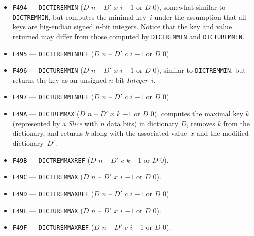\documentclass[12pt,oneside]{article}
\begin{document}
\begin{itemize}
\item {\tt F494} --- {\tt DICTIREMMIN} ($D$ $n$ -- $D'$ $x$ $i$ $-1$ or $D$ $0$), somewhat similar to {\tt DICTREMMIN}, but computes the minimal key~$i$ under the assumption that all keys are big-endian signed $n$-bit integers. Notice that the key and value returned may differ from those computed by {\tt DICTREMMIN} and {\tt DICTUREMMIN}.
\item {\tt F495} --- {\tt DICTIREMMINREF} ($D$ $n$ -- $D'$ $c$ $i$ $-1$ or $D$ $0$).
\item {\tt F496} --- {\tt DICTUREMMIN} ($D$ $n$ -- $D'$ $x$ $i$ $-1$ or $D$ $0$), similar to {\tt DICTREMMIN}, but returns the key as an unsigned $n$-bit {\em Integer}~$i$.
\item {\tt F497} --- {\tt DICTUREMMINREF} ($D$ $n$ -- $D'$ $c$ $i$ $-1$ or $D$ $0$).
\item {\tt F49A} --- {\tt DICTREMMAX} ($D$ $n$ -- $D'$ $x$ $k$ $-1$ or $D$ $0$), computes the maximal key $k$ (represented by a {\em Slice\/} with $n$ data bits) in dictionary $D$, removes $k$ from the dictionary, and returns $k$ along with the associated value~$x$ and the modified dictionary~$D'$.
\item {\tt F49B} --- {\tt DICTREMMAXREF} ($D$ $n$ -- $D'$ $c$ $k$ $-1$ or $D$ $0$).
\item {\tt F49C} --- {\tt DICTIREMMAX} ($D$ $n$ -- $D'$ $x$ $i$ $-1$ or $D$ $0$).
\item {\tt F49D} --- {\tt DICTIREMMAXREF} ($D$ $n$ -- $D'$ $c$ $i$ $-1$ or $D$ $0$).
\item {\tt F49E} --- {\tt DICTUREMMAX} ($D$ $n$ -- $D'$ $x$ $i$ $-1$ or $D$ $0$).
\item {\tt F49F} --- {\tt DICTUREMMAXREF} ($D$ $n$ -- $D'$ $c$ $i$ $-1$ or $D$ $0$).
\end{itemize}
\end{document}
